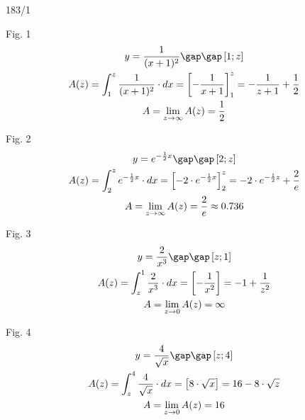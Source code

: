 \begin{exercise}{183/1}
  \item [Fig. 1]
  \begin{gather*}
    y = \frac{1}{(x + 1)^2} \gap\gap \left[1; z\right] \\
    A(z) = \int_1^z \frac{1}{(x + 1)^2} \cdot dx = \left[-\frac{1}{x + 1}\right]_1^z = -\frac{1}{z + 1} + \frac{1}{2} \\
    A = \lim\limits_{z \to \infty} A(z) = \frac{1}{2}
  \end{gather*}
  \item [Fig. 2]
  \begin{gather*}
    y = e^{-\frac{1}{2}x} \gap\gap \left[2; z\right] \\
    A(z) = \int_2^z e^{-\frac{1}{2}x} \cdot dx = \left[-2 \cdot e^{-\frac{1}{2}x}\right]_2^z = -2 \cdot e^{-\frac{1}{2}z} + \frac{2}{e} \\
    A = \lim\limits_{z \to \infty} A(z) = \frac{2}{e} \approx 0.736
  \end{gather*}
  \item [Fig. 3]
  \begin{gather*}
    y = \frac{2}{x^3} \gap\gap \left[z; 1\right] \\
    A(z) = \int_z^1 \frac{2}{x^3} \cdot dx = \left[-\frac{1}{x^2}\right] = -1 + \frac{1}{z^2} \\
    A = \lim\limits_{z \to 0} A(z) = \infty
  \end{gather*}
  \item [Fig. 4]
  \begin{gather*}
    y = \frac{4}{\sqrt{x}} \gap\gap \left[z; 4\right] \\
    A(z) = \int_z^4 \frac{4}{\sqrt{x}} \cdot dx = \left[8 \cdot \sqrt{x}\right] = 16 - 8 \cdot \sqrt{z} \\
    A = \lim\limits_{z \to 0} A(z) = 16
  \end{gather*}
\end{exercise}
